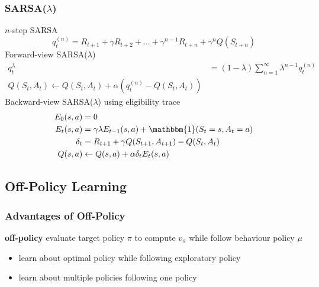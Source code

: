 \documentclass[]{article}
\theoremstyle{definition}
\newcommand{\ind}{\mathbbm{1}}
\begin{document}
\subsubsection{SARSA($\lambda$)}%
\label{ssub:sarsa_lambda}
$n$-step SARSA
\begin{equation*}
    q_t^{(n)} = R_{t+1} + \gamma R_{t+2} + \ldots + \gamma^{n-1} R_{t+n} + \gamma^n Q(S_{t+n})
\end{equation*}
Forward-view SARSA($\lambda$)
\begin{align*}
    q_t^\lambda &= (1 - \lambda) \sum_{n=1}^\infty \lambda^{n-1} q_t^{(n)} \\
    Q(S_t, A_t) \gets Q(S_t, A_t) + \alpha (q_t^{(n)} - Q(S_t, A_t))
\end{align*}
Backward-view SARSA($\lambda$) using eligibility trace
\begin{align*}
    E_0(s,a) &= 0 \\
    E_t(s,a) &= \gamma \lambda E_{t-1}(s,a) + \ind(S_t = s, A_t =a) \\
    \delta_t &= R_{t+1} + \gamma Q(S_{t+1}, A_{t+1}) - Q(S_t, A_t) \\
    Q(s,a) &\gets Q(s,a) + \alpha \delta_t E_t(s,a)
\end{align*}


\subsection{Off-Policy Learning}%
\label{sub:off_policy_learning}

\subsubsection{Advantages of Off-Policy}%
\label{ssub:advantages_of_off_policy}
\textbf{off-policy} evaluate target policy $\pi$ to compute $v_\pi$ while follow behaviour policy $\mu$
\begin{itemize}
    \item learn about optimal policy while following exploratory policy
    \item learn about multiple policies following one policy
\end{itemize}
\end{document}
